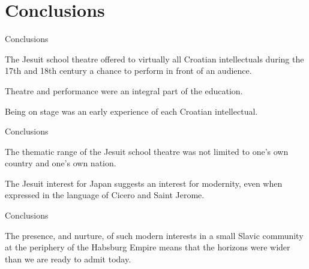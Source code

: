 \documentclass[14pt]{beamer}
\begin{document}
\section{Conclusions}

\begin{frame}{Conclusions}

The Jesuit school theatre offered to virtually all Croatian intellectuals during the 17th and 18th century a chance to perform in front of an audience. 

Theatre and performance were an integral part of the education.

Being on stage was an early experience of each Croatian intellectual.


\end{frame}

\begin{frame}{Conclusions}

The thematic range of the Jesuit school theatre was not limited to one's own country and one's own nation. 

The Jesuit interest for Japan suggests an interest for modernity, even when expressed in the language of Cicero and Saint Jerome. 




\end{frame}

\begin{frame}{Conclusions}

The presence, and nurture, of such modern interests in a small Slavic community at the periphery of the Habsburg Empire means that the horizons were wider than we are ready to admit today.

\end{frame}



  \maketitle
\end{document}
